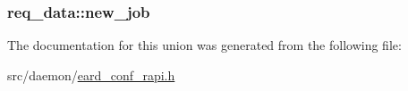 \subsubsection[{\texorpdfstring{new\+\_\+job}{new_job}}]{ req\+\_\+data\+::new\+\_\+job}\hypertarget{unionreq__data_acd61e6ce769ca1d6b24bc2ae5ed20807}{}\label{unionreq__data_acd61e6ce769ca1d6b24bc2ae5ed20807}


The documentation for this union was generated from the following file\+:\begin{DoxyCompactItemize}
\item 
src/daemon/\hyperlink{eard__conf__rapi_8h}{eard\+\_\+conf\+\_\+rapi.\+h}\end{DoxyCompactItemize}
